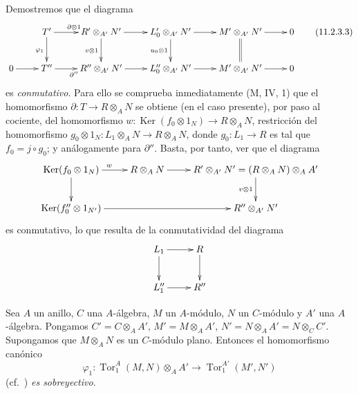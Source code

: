 Demostremos que el diagrama
\begin{equation}
\xymatrix{
&T'\ar[r]^{\partial\otimes1}\ar[d]_{\varphi_1}&
R'\otimes_{A'}N'\ar[r]\ar[d]_{v\otimes1}&
L'_0\otimes_{A'}N'\ar[r]\ar[d]_{u_0\otimes1}&
M'\otimes_{A'}N'\ar[r]\ar@{=}[d]&0\\
0\ar[r]&T''\ar[r]_{\partial''}&R''\otimes_{A'}N'\ar[r]&
L''_0\otimes_{A'}N'\ar[r]&M'\otimes_{A'}N'\ar[r]&0
}
\label{IV.11.2.3.3-fr}
\tag{11.2.3.3}
\end{equation}
es \emph{conmutativo}. Para ello se comprueba inmediatamente (M, IV, 1) que el homomorfismo $\partial:T\to R\otimes_AN$ se obtiene (en el caso presente), por paso al cociente, del homomorfismo $w:\operatorname{Ker}(f_0\otimes1_N)\to R\otimes_AN$, restricción del homomorfismo $g_0\otimes1_N:L_1\otimes_AN\to R\otimes_AN$, donde $g_0:L_1\to R$ es tal que $f_0=j\circ g_0$; y análogamente para $\partial''$. Basta, por tanto, ver que el diagrama
\[
\xymatrix{
\operatorname{Ker}(f_0\otimes1_N)\ar[r]^w\ar[d]&R\otimes_AN\ar[r]&
R'\otimes_{A'}N'=(R\otimes_AN)\otimes_AA'\ar[d]_{v\otimes1}\\
\operatorname{Ker}(f''_0\otimes1_{N'})\ar[rr]&&R''\otimes_{A'}N'
}
\]
es conmutativo, lo que resulta de la conmutatividad del diagrama
\[
\xymatrix{
L_1\ar[r]\ar[d]&R\ar[d]\\
L''_1\ar[r]&R''
}
\]

\begin{lemma}[11.2.4]
\label{IV.11.2.4}
Sea $A$ un anillo, $C$ una $A$-álgebra, $M$ un $A$-módulo, $N$ un $C$-módulo y $A'$ una $A$-álgebra. Pongamos $C'=C\otimes_AA'$, $M'=M\otimes_AA'$, $N'=N\otimes_AA'=N\otimes_CC'$. Supongamos que $M\otimes_AN$ es un $C$-módulo plano. Entonces el homomorfismo canónico
\[
\varphi_1:\operatorname{Tor}_1^A(M,N)\otimes_AA'
\to\operatorname{Tor}_1^{A'}(M',N')
\]
\textup{(cf.\ )} \emph{es sobreyectivo}.
\end{lemma}

